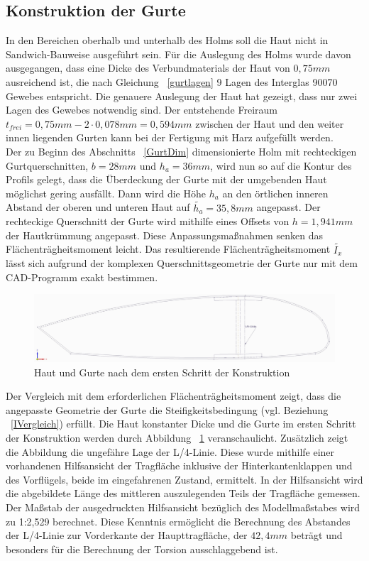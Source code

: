 \subsection{Konstruktion der Gurte}
\label{GurtKonstrukt}
\noindent In den Bereichen oberhalb und unterhalb des Holms soll die Haut nicht in Sandwich-Bauweise ausgeführt sein. Für die Auslegung des Holms wurde davon ausgegangen, dass eine Dicke des Verbundmaterials der Haut von $ 0,75mm $ ausreichend ist, die nach Gleichung ~\ref{gurtlagen} 9 Lagen des Interglas 90070 Gewebes entspricht. Die genauere Auslegung der Haut hat gezeigt, dass nur zwei Lagen des Gewebes notwendig sind. Der entstehende Freiraum $t_{frei}= 0,75mm-2\cdot 0,078mm=0,594mm $ zwischen der Haut und den weiter innen liegenden Gurten kann bei der Fertigung mit Harz aufgefüllt werden.\\
\noindent Der zu Beginn des Abschnitts ~\ref{GurtDim} dimensionierte Holm mit rechteckigen Gurtquerschnitten, $ b=28mm $ und $ h_{a}=36mm $, wird nun so auf die Kontur des Profils gelegt, dass die Überdeckung der Gurte mit der umgebenden Haut möglichst gering ausfällt. Dann wird die Höhe $ h_{a} $ an den örtlichen inneren Abstand der oberen und unteren Haut auf $\tilde{h_{a}}=35,8mm $ angepasst. Der rechteckige Querschnitt der Gurte wird mithilfe eines Offsets von $ {h}=1,941mm $ der Hautkrümmung angepasst. Diese Anpassungsmaßnahmen senken das Flächenträgheitsmoment leicht. Das resultierende Flächenträgheitsmoment $ \tilde{I_{x}} $ lässt sich aufgrund der komplexen Querschnittsgeometrie der Gurte nur mit dem CAD-Programm exakt bestimmen. 
\begin{figure}[h]
	\includegraphics[width=1.0\textwidth]{Bilder/Kontur.jpg}
	\caption{Haut und Gurte nach dem ersten Schritt der Konstruktion}
	\label{fig: Kontur}
\end{figure} 
Der Vergleich mit dem erforderlichen Flächenträgheitsmoment zeigt, dass die angepasste Geometrie der Gurte die Steifigkeitsbedingung (vgl. Beziehung ~\ref{IVergleich}) erfüllt. Die Haut konstanter Dicke und die Gurte im ersten Schritt der Konstruktion werden durch Abbildung ~\ref{fig: Kontur} veranschaulicht. Zusätzlich zeigt die Abbildung die ungefähre Lage der L/4-Linie. Diese wurde mithilfe einer vorhandenen Hilfsansicht der Tragfläche inklusive der Hinterkantenklappen und des Vorflügels, beide im eingefahrenen Zustand, ermittelt. In der Hilfsansicht wird die abgebildete Länge des mittleren auszulegenden Teils der Tragfläche gemessen. Der Maßstab der ausgedruckten Hilfsansicht bezüglich des Modellmaßstabes wird zu 1:2,529 berechnet. Diese Kenntnis ermöglicht die Berechnung des Abstandes der L/4-Linie zur Vorderkante der Haupttragfläche, der $ 42,4mm $ beträgt und besonders für die Berechnung der Torsion ausschlaggebend ist.\\

